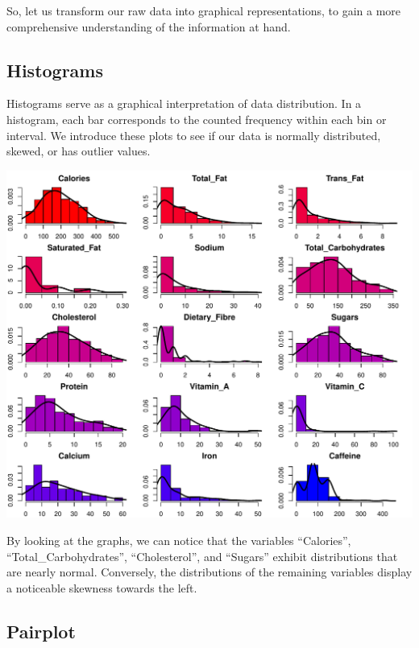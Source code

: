 \documentclass[
]{article}
\begin{document}
So, let us transform our raw data into graphical representations, to
gain a more comprehensive understanding of the information at hand.

\hypertarget{histograms}{%
\subsection{Histograms}\label{histograms}}

Histograms serve as a graphical interpretation of data distribution. In
a histogram, each bar corresponds to the counted frequency within each
bin or interval. We introduce these plots to see if our data is normally
distributed, skewed, or has outlier values.

\begin{center}\includegraphics{Statistical_Learning_Final_Report_files/figure-latex/histograms-1} \end{center}

By looking at the graphs, we can notice that the variables ``Calories'',
``Total\_Carbohydrates'', ``Cholesterol'', and ``Sugars'' exhibit
distributions that are nearly normal. Conversely, the distributions of
the remaining variables display a noticeable skewness towards the left.

\hypertarget{pairplot}{%
\subsection{Pairplot}\label{pairplot}}
\end{document}
